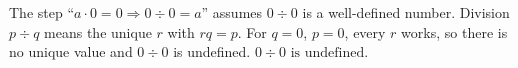 The step ``$a\cdot0=0\Rightarrow0\div0=a$'' assumes $0\div0$ is a well-defined number. Division $p\div q$ means the unique $r$ with $rq=p$. For $q=0$, $p=0$, every $r$ works, so there is no unique value and $0\div0$ is undefined. $\boxed{0\div0\text{ is undefined}}$.
